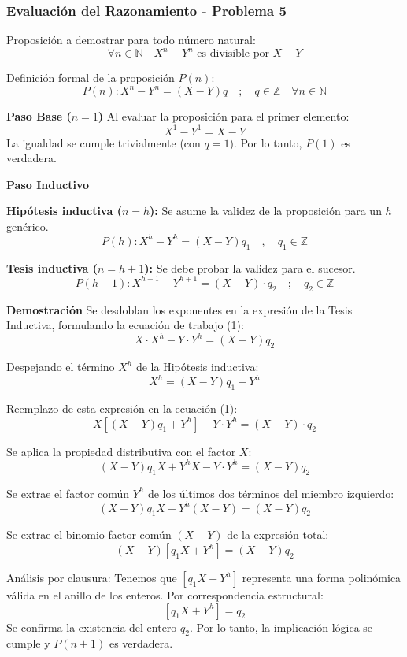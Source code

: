 \documentclass{article}
\begin{document}
\subsubsection{Evaluación del Razonamiento - Problema 5}
\label{sec:evaluacion-5}
\bigskip

\noindent Proposición a demostrar para todo número natural:
\[ \forall n \in \mathbb{N} \quad X^n - Y^n \text{ es divisible por } X - Y \]

\noindent Definición formal de la proposición $P(n)$:
\[ P(n): X^n - Y^n = (X - Y)q \quad ; \quad q \in \mathbb{Z} \quad \forall n \in \mathbb{N} \]

\textbf{Paso Base ($n=1$)}
Al evaluar la proposición para el primer elemento:
\[ X^1 - Y^1 = X - Y \]
La igualdad se cumple trivialmente (con $q=1$). Por lo tanto, $P(1)$ es verdadera.

\textbf{Paso Inductivo}

\textbf{Hipótesis inductiva ($n=h$):}
Se asume la validez de la proposición para un $h$ genérico.
\[ P(h): X^h - Y^h = (X - Y)q_1 \quad , \quad q_1 \in \mathbb{Z} \]

\textbf{Tesis inductiva ($n=h+1$):}
Se debe probar la validez para el sucesor.
\[ P(h+1): X^{h+1} - Y^{h+1} = (X - Y) \cdot q_2 \quad ; \quad q_2 \in \mathbb{Z} \]

\textbf{Demostración}
Se desdoblan los exponentes en la expresión de la Tesis Inductiva, formulando la ecuación de trabajo (1):
\begin{equation}
    X \cdot X^h - Y \cdot Y^h = (X - Y) q_2 \tag{1}
\end{equation}

\noindent Despejando el término $X^h$ de la Hipótesis inductiva:
\[ X^h = (X - Y)q_1 + Y^h \]

\noindent Reemplazo de esta expresión en la ecuación (1):
\[ X \left[ (X - Y)q_1 + Y^h \right] - Y \cdot Y^h = (X - Y) \cdot q_2 \]

\noindent Se aplica la propiedad distributiva con el factor $X$:
\[ (X - Y)q_1 X + Y^h X - Y \cdot Y^h = (X - Y)q_2 \]

\noindent Se extrae el factor común $Y^h$ de los últimos dos términos del miembro izquierdo:
\[ (X - Y)q_1 X + Y^h(X - Y) = (X - Y)q_2 \]

\noindent Se extrae el binomio factor común $(X - Y)$ de la expresión total:
\[ (X - Y) \left[ q_1 X + Y^h \right] = (X - Y)q_2 \]

\noindent Análisis por clausura: Tenemos que $\left[ q_1 X + Y^h \right]$ representa una forma polinómica válida en el anillo de los enteros. Por correspondencia estructural:
\[ \left[ q_1 X + Y^h \right] = q_2 \]
Se confirma la existencia del entero $q_2$. Por lo tanto, la implicación lógica se cumple y $P(n+1)$ es verdadera.
\end{document}

